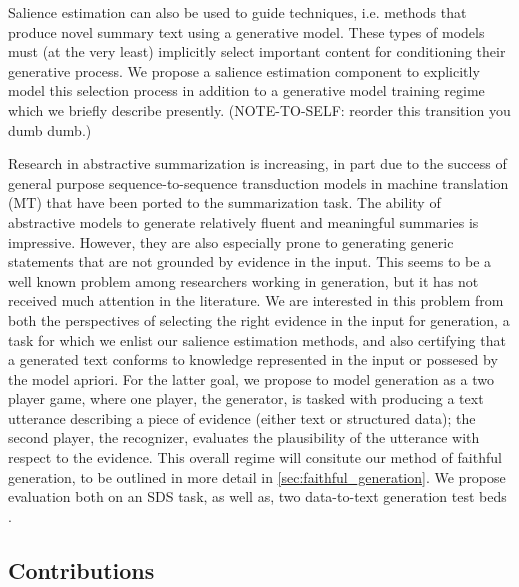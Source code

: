 Salience estimation can also be used to guide  techniques, i.e. methods that produce novel
summary text using a generative model. These types of models 
must (at the very least) implicitly select important content for conditioning 
their
generative process. We propose a salience estimation component to 
explicitly model this selection process in addition to a generative model 
training regime which we briefly describe presently. (NOTE-TO-SELF: reorder this transition you dumb dumb.)

Research in abstractive summarization is increasing, in part due to
the success of general purpose sequence-to-sequence transduction models 
in machine translation (MT) that have been ported to the summarization task.
The ability of abstractive models to generate relatively fluent and 
meaningful summaries is impressive. However, they are also especially prone 
to generating generic statements that are not grounded by evidence in the 
input. This seems to be a well known problem among researchers working
in generation, but it has not received much attention in the literature.
We are interested in this problem from both the perspectives of selecting
the right evidence in the input for generation, a task for which we enlist
our salience estimation methods, and also certifying that a generated text
conforms to knowledge represented in the input or possesed by the model
apriori. For the latter goal, we propose to model generation as a two player
game, where one player, the generator, is tasked with producing a text
utterance describing a piece of evidence (either text or structured data);
the second player, the recognizer, %
evaluates the plausibility of the utterance with respect to the evidence.
This overall regime will consitute our method of faithful generation,
to be outlined in more detail in \autoref{sec:faithful_generation}. We propose 
evaluation both on an SDS task, as well as, two data-to-text generation 
test beds \citep{lebret2016neural,wiseman2017challenges}.

\subsection{Contributions}

